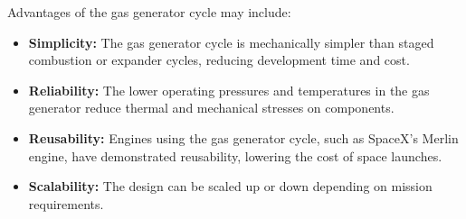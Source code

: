 \documentclass[12pt]{article}
\begin{document}
Advantages of the gas generator cycle may include:
\begin{itemize}
    \item \textbf{Simplicity:} The gas generator cycle is mechanically simpler than staged combustion or expander cycles, reducing development time and cost.
    \item \textbf{Reliability:} The lower operating pressures and temperatures in the gas generator reduce thermal and mechanical stresses on components.
    \item \textbf{Reusability:} Engines using the gas generator cycle, such as SpaceX's Merlin engine, have demonstrated reusability, lowering the cost of space launches.
    \item \textbf{Scalability:} The design can be scaled up or down depending on mission requirements.
\end{itemize}

\end{document}
